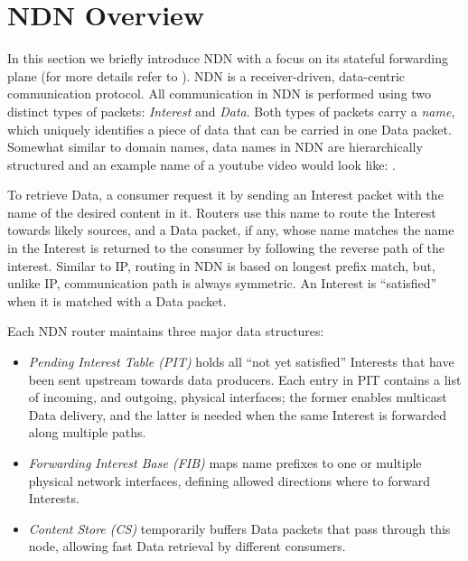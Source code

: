 \section{NDN Overview\label{sec:ccn-intro}}

In this section we briefly introduce NDN with a focus on its stateful forwarding plane (for more details refer to \cite{ndn-conext, ndn-tr, adaptive-forwarding}).
NDN is a receiver-driven, data-centric communication protocol.
All communication in NDN is performed using two distinct types of packets: \textit{Interest} and \textit{Data}. Both types of packets carry a \textit{name}, which uniquely identifies a piece of data that can be carried in one Data packet. Somewhat similar to domain names, data names in NDN are hierarchically structured and an example name of a youtube video would look like: .

To retrieve Data, a consumer request it by sending an Interest packet with the name of the desired content in it.
Routers use this name to route the Interest towards likely sources, and a Data packet, if any, whose name matches the name in the Interest is returned to the consumer by following the reverse path of the interest. Similar to IP, routing in NDN is based on longest prefix match, but, unlike IP,  communication path is always symmetric. An Interest is ``satisfied'' when it is matched with a Data packet.

Each NDN router maintains three major data structures:
\begin{itemize}
\item \textit{Pending Interest Table (PIT)} holds all ``not yet satisfied'' Interests that have been sent upstream towards data producers. Each entry in PIT contains a list of incoming, and outgoing, physical interfaces; the former enables multicast Data delivery, and the latter is needed when the same Interest is forwarded along multiple paths.
\item \textit{Forwarding Interest Base (FIB)} maps name prefixes to one or multiple physical network interfaces, defining allowed %
 directions where to forward Interests. 
\item \textit{Content Store (CS)} temporarily buffers Data packets that pass through this node, allowing fast Data retrieval by different consumers.
\end{itemize}

